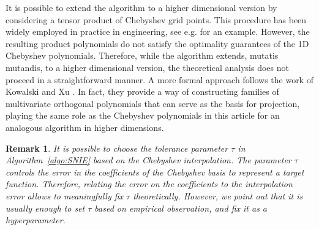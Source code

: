 \documentclass[11pt,fleqn]{amsart} %
\newtheorem{remark}[theorem]{Remark}
\begin{document}
	\begin{algorithm}[h!]
		\caption{Algorithm for the spectral neural integral equation model.}
		\label{algo:SNIE}
		\begin{algorithmic}[1]
			 
			 
			\EndWhile
			 
			 
			 
		\end{algorithmic}
	\end{algorithm}
	
	
	It is possible to extend the algorithm to a higher dimensional version by considering a tensor product of Chebyshev grid points. This procedure has been widely employed in practice in engineering, see e.g. \cite{Cheb_tens} for an example. However, the resulting product polynomials do not satisfy the optimality guarantees of the 1D Chebyshev polynomials. Therefore, while the algorithm extends, mutatis mutandis, to a higher dimensional version, the theoretical analysis does not proceed in a straightforward manner. A more formal approach follows the work of Kowalski \cite{Kow1,Kow2} and Xu \cite{Xu1,Xu2}. In fact, they provide a way of constructing families of multivariate orthogonal polynomials that can serve as the basis for projection, playing the same role as the Chebyshev polynomials in this article for an analogous algorithm in higher dimensions. 
		
	\begin{remark}
			{\rm 
					It is possible to choose the tolerance parameter $\tau$ in Algorithm~\ref{algo:SNIE} based on the Chebyshev interpolation. The parameter $\tau$ controls the error in the coefficients of the Chebyshev basis to represent a target function. Therefore, relating the error on the coefficients to the interpolation error allows to meaningfully fix $\tau$ theoretically. However, we point out that it is usually enough to set $\tau$ based on empirical observation, and fix it as a hyperparameter. 
			}
	\end{remark}	
	
\end{document}
